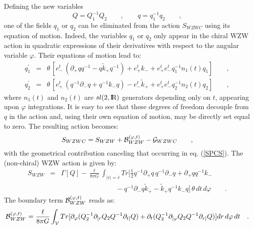 \documentclass[a4paper,10pt]{article}
\begin{document}
Defining the new variables  
\begin{equation} 
\label{Q12} 
Q=Q_1^{-1} Q_2 \qquad , \qquad 
q=q_1^{-1} q_2 \qquad ,  
\end{equation} 
one of the fields $q_1$ or $q_2$ can be eliminated from the action $S_{WZWC}$  
using its equation of motion. 
Indeed, the variables $q_1$ or $q_2$ only appear in the  
chiral WZW action in quadratic expressions of their derivatives with 
respect to the angular variable $\varphi$. Their equations of motion lead to: 
\begin{eqnarray} 
\label{q1} 
q_1^\prime &=& \theta \, [ {e_{-}^t} \,  
  ( \partial_{+} q q^{-1}  - q \tilde k_{+} q^{-1} ) + 
    {e^t_{+}} k_{-} +  e^t_+ e^t_- q_1^{-1} n_1(t) q_1 ] \qquad , \\ 
\label{q2} 
q_2^\prime &=& \theta \, [{e_{+}^t} \, 
   ( q^{-1} \partial_{-} q   + q^{-1} k_{-} q ) - 
    {e^t_{-}} \tilde k_{+} +  e^t_+ e^t_- q_2^{-1} n_2(t) q_2 ]  \qquad , 
\end{eqnarray} 
where $n_1(t)$ and $n_2(t)$ are $sl(2,{\hbox{{\rm I}\kern-.2em\hbox{\rm R}}})$ generators depending only 
on $t$, appearing upon $\varphi$ integrations. It is easy to see that these 
degrees of freedom decouple from $q$ in the action and, using their 
own equation of motion, may be directly set equal to zero. 
The resulting action becomes: 
\begin{equation} 
\label{WZWCWZW} 
S_{WZWC} = S_{WZW} + {\cal B}^{(\varphi,t)}_{WZW} - {\cal G}_{WZWC}  
\qquad , 
\end{equation} 
with the geometrical contribution canceling 
that occurring in eq. (\ref{SPCS}). 
The (non-chiral) WZW action is given by: 
\begin{eqnarray} 
S_{WZW} &=& \Gamma[Q]  
   - \frac {\ell} {8 \pi G} \int_{|r|=\bar r} 
 Tr[ \frac 1 2 q^{-1}\partial_{+} q \, q^{-1}\partial_{-} q  
    +  \partial_{+} q  q^{-1} k_{-}  \nonumber\\ 
\label{WZW} 
   && \qquad \qquad \qquad \qquad   -   
   q^{-1} \partial_{-} q  \tilde k_{+} 
  - \tilde k_{+} q^{-1} k_{-} q ]  
  \, \theta \, dt \, d\varphi \qquad .  
\end{eqnarray} 
The boundary term ${\cal B}^{(\varphi,t)}_{WZW}$ reads as:  
\begin{equation} 
\label{BWZW} 
{\cal B}^{(\varphi,t)}_{WZW} =  \frac {\ell}  {8 \pi G} 
\int_{\cal V} Tr [ \partial_\varphi 
(Q_2^{-1} \partial_{[r} Q_2  Q^{-1} \partial_{t]} Q) + 
\partial_t 
(Q_2^{-1} \partial_{[\varphi} Q_2 Q^{-1} \partial_{r]} Q)] 
 dr\, d\varphi\, dt \quad .  
\end{equation} 
\end{document}
